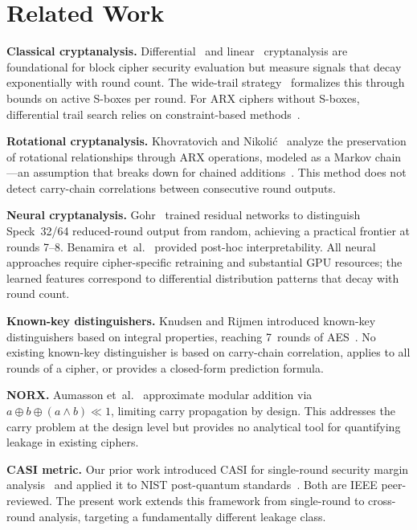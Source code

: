 \documentclass[conference,a4paper]{IEEEtran}
\begin{document}
\section{Related Work}

\textbf{Classical cryptanalysis.} Differential~\cite{biham1991} and linear~\cite{matsui1993} cryptanalysis are foundational for block cipher security evaluation but measure signals that decay exponentially with round count. The wide-trail strategy~\cite{daemen2002} formalizes this through bounds on active S-boxes per round. For ARX ciphers without S-boxes, differential trail search relies on constraint-based methods~\cite{biryukov2014}.

\textbf{Rotational cryptanalysis.} Khovratovich and Nikoli\'c~\cite{khovratovich2010} analyze the preservation of rotational relationships through ARX operations, modeled as a Markov chain---an assumption that breaks down for chained additions~\cite{khovratovich2015}. This method does not detect carry-chain correlations between consecutive round outputs.

\textbf{Neural cryptanalysis.} Gohr~\cite{gohr2019} trained residual networks to distinguish Speck~32/64 reduced-round output from random, achieving a practical frontier at rounds 7--8. Benamira et~al.~\cite{benamira2021} provided post-hoc interpretability. All neural approaches require cipher-specific retraining and substantial GPU resources; the learned features correspond to differential distribution patterns that decay with round count.

\textbf{Known-key distinguishers.} Knudsen and Rijmen introduced known-key distinguishers based on integral properties, reaching 7~rounds of AES~\cite{knudsen2007}. No existing known-key distinguisher is based on carry-chain correlation, applies to all rounds of a cipher, or provides a closed-form prediction formula.

\textbf{NORX.} Aumasson et~al.~\cite{aumasson2014} approximate modular addition via $a \oplus b \oplus (a \wedge b) \ll 1$, limiting carry propagation by design. This addresses the carry problem at the design level but provides no analytical tool for quantifying leakage in existing ciphers.

\textbf{CASI metric.} Our prior work introduced CASI for single-round security margin analysis~\cite{foss2026crypto} and applied it to NIST post-quantum standards~\cite{foss2026artifact}. Both are IEEE peer-reviewed. The present work extends this framework from single-round to cross-round analysis, targeting a fundamentally different leakage class.
\end{document}
